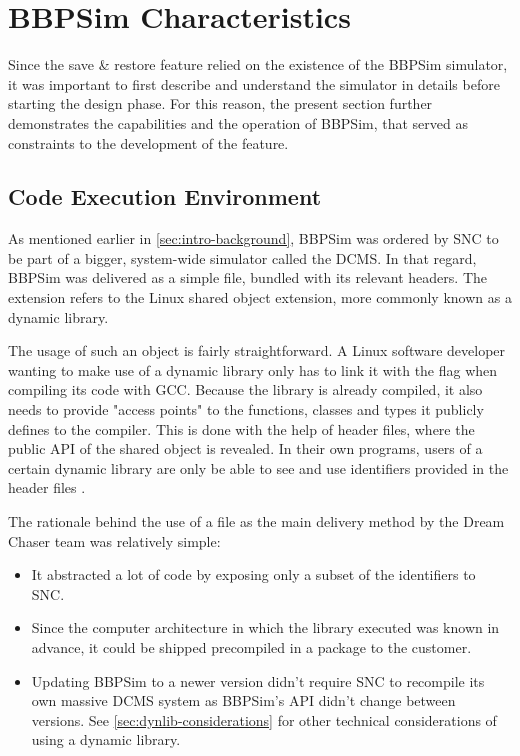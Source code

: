 {\section{BBPSim Characteristics}\label{sec:bbpsim-charact}
Since the save \& restore feature relied on the existence of the \gls{BBPSim} simulator, it was important to first describe and understand the simulator in details before starting the design phase. For this reason, the present section further demonstrates the capabilities and the operation of \gls{BBPSim}, that served as constraints to the development of the feature.

\subsection*{Code Execution Environment}
As mentioned earlier in \autoref{sec:intro-background}, \gls{BBPSim} was ordered by \gls{SNC} to be part of a bigger, system-wide simulator called the \gls{DCMS}. In that regard, \gls{BBPSim} was delivered as a simple  file, bundled with its relevant headers. The  extension refers to the Linux shared object extension, more commonly known as a dynamic library. 

The usage of such an object is fairly straightforward. A Linux software developer wanting to make use of a dynamic library only has to link it with the  flag when compiling its code with GCC. Because the library is already compiled, it also needs to provide "access points" to the functions, classes and types it publicly defines to the compiler. This is done with the help of header files, where the public API of the shared object is revealed. In their own programs, users of a certain dynamic library are only be able to see and use identifiers provided in the header files .

The rationale behind the use of a  file as the main delivery method by the Dream Chaser team was relatively simple:
\begin{itemize}
	\item It abstracted a lot of code by exposing only a subset of the identifiers to \gls{SNC}.
	\item Since the computer architecture in which the library executed was known in advance, it could be shipped precompiled in a package to the customer.
	\item Updating \gls{BBPSim} to a newer version didn't require \gls{SNC} to recompile its own massive \gls{DCMS} system as \gls{BBPSim}'s API didn't change between versions. See \autoref{sec:dynlib-considerations} for other  technical considerations of using a dynamic library.
\end{itemize}

}

